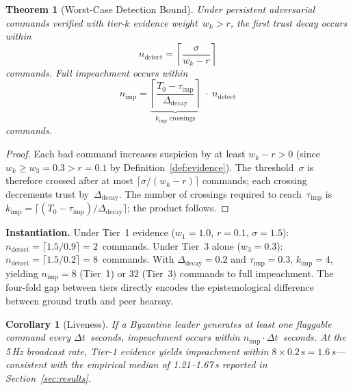 \documentclass[conference]{IEEEtran}
\newtheorem{theorem}{Theorem}
\newtheorem{corollary}{Corollary}
\begin{document}
\begin{theorem}[Worst-Case Detection Bound]
\label{thm:detection}
Under persistent adversarial commands verified with tier-$k$ evidence weight~$w_k > r$, the first trust decay occurs within
\begin{equation}
    n_{\text{detect}} = \left\lceil \frac{\sigma}{w_k - r}
    \right\rceil
    \label{eq:detection_bound}
\end{equation}
commands. Full impeachment occurs within
\begin{equation}
    n_{\text{imp}} = \underbrace{\left\lceil
    \frac{T_0 - \tau_{\text{imp}}}{\Delta_{\text{decay}}}
    \right\rceil}_{k_{\text{imp}}\text{ crossings}} \;\cdot\;
    n_{\text{detect}}
    \label{eq:impeachment_bound}
\end{equation}
commands.
\end{theorem}

\begin{proof}
Each bad command increases suspicion by at least $w_k - r > 0$ (since $w_k \geq w_3 = 0.3 > r = 0.1$ by Definition~\ref{def:evidence}). The threshold~$\sigma$ is therefore crossed after at most $\lceil\sigma/(w_k - r)\rceil$ commands; each crossing decrements trust by~$\Delta_{\text{decay}}$. The number of crossings required to reach~$\tau_{\text{imp}}$ is $k_{\text{imp}} = \lceil(T_0 - \tau_{\text{imp}})/\Delta_{\text{decay}}\rceil$; the product follows.
\end{proof}

\noindent\textbf{Instantiation.}\;
Under Tier~1 evidence ($w_1{=}1.0$, $r{=}0.1$, $\sigma{=}1.5$): $n_{\text{detect}} = \lceil 1.5/0.9 \rceil = 2$~commands. Under Tier~3 alone ($w_3{=}0.3$): $n_{\text{detect}} = \lceil 1.5/0.2 \rceil = 8$~commands. With $\Delta_{\text{decay}}{=}0.2$ and $\tau_{\text{imp}}{=}0.3$, $k_{\text{imp}} = 4$, yielding $n_{\text{imp}} = 8$ (Tier~1) or $32$ (Tier~3) commands to full impeachment. The four-fold gap between tiers directly encodes the epistemological difference between ground truth and peer hearsay.

\begin{corollary}[Liveness]
\label{cor:liveness}
If a Byzantine leader generates at least one flaggable command every $\Delta t$~seconds, impeachment occurs within $n_{\text{imp}} \cdot \Delta t$~seconds. At the 5\,Hz broadcast rate, Tier-1 evidence yields impeachment within $8 \times 0.2\,\text{s} = 1.6\,$s---consistent with the empirical median of 1.21--1.67\,s reported in Section~\ref{sec:results}.
\end{corollary}
\end{document}
